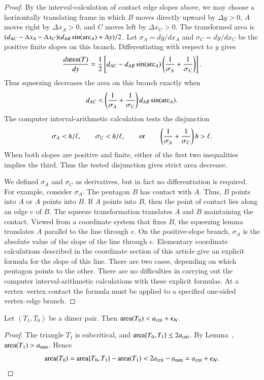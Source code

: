 \begin{proof}
  By the interval-calculation of contact edge slopes above, we may
  choose a horizontally translating
  frame in which $B$ moves directly upward by $\Delta y>0$,
  $A$ moves right by $\Delta x_A>0$, and $C$ moves left by
  $\Delta x_C>0$.  The transformed area is
  $(d_{AC}-\Delta x_A - \Delta x_C)
  (d_{AB}\sin(\operatorname{arc}_A)+\Delta y)/2$.
  Let $\sigma_A=dy/dx_A$ and $\sigma_C=dy/dx_C$ be the
  positive finite slopes on this branch.  Differentiating with
  respect to $y$ gives
\[
\frac{d{\operatorname{area}}(T)}{dy}
=\frac12\left[d_{AC}-d_{AB}\sin(\operatorname{arc}_A)
 \left(\frac1{\sigma_A}+\frac1{\sigma_C}\right)\right].
\]
  Thus squeezing decreases the area on this branch exactly when
\[
d_{AC} < \left(\frac{1}{\sigma_A}
+\frac{1}{\sigma_C}\right)d_{AB}\sin(\operatorname{arc}_A).
\]
The computer
interval-arithmetic calculation
tests the disjunction
\[
\sigma_A<h/\ell,\qquad \sigma_C<h/\ell,\qquad\hbox{or}\qquad
\left(\frac1{\sigma_A}+\frac1{\sigma_C}\right)h>\ell.
\]
When both slopes are positive and finite, either of the first two
inequalities implies the third. Thus the tested disjunction gives
strict area decrease.

We defined $\sigma_A$ and $\sigma_C$ as derivatives, but in fact no
differentiation is required.  For example, consider $\sigma_A$.  The
pentagon $B$ has contact with $A$.  Thus, $B$ points into $A$ or $A$
points into $B$.  If $A$ points into $B$, then the point of contact
lies along an edge $e$ of $B$.  The squeeze transformation translates
$A$ and $B$ maintaining the contact.  Viewed from a coordinate system
that fixes $B$, the squeezing lemma translates $A$ parallel to the
line through $e$.  On the positive-slope branch, $\sigma_A$ is the absolute value of
the slope of the line through $e$.  Elementary coordinate calculations
described in the coordinate section of this article give an explicit
formula for the slope of this line.  There are two cases, depending on
which pentagon points to the other.  There are no difficulties in
carrying out the computer interval-arithmetic calculations with these explicit formulas.
At a vertex--vertex contact the formula must be applied to a
specified one-sided vertex--edge branch.
\end{proof}

\begin{lemma}
  Let $(T_1,T_0)$ be a dimer pair.
  Then ${\operatorname{area}}(T_0) < a_\text{crit}+\epsilon_{\mathcal N}$.
\end{lemma}

\begin{proof}
The triangle $T_1$ is subcritical, and
${\operatorname{area}}\{T_0,T_1\}\le2a_\text{crit}$.  By Lemma~,
${\operatorname{area}}(T_1)>a_\text{min}$.  Hence
\begin{equation}\libel{eq:dimer-acrit-epsN}
\area(T_0) = \area\{T_0,T_1\} - \area(T_1) 
< 2\acrit - \ao = \acrit+\epsN.
\end{equation}
\end{proof}

